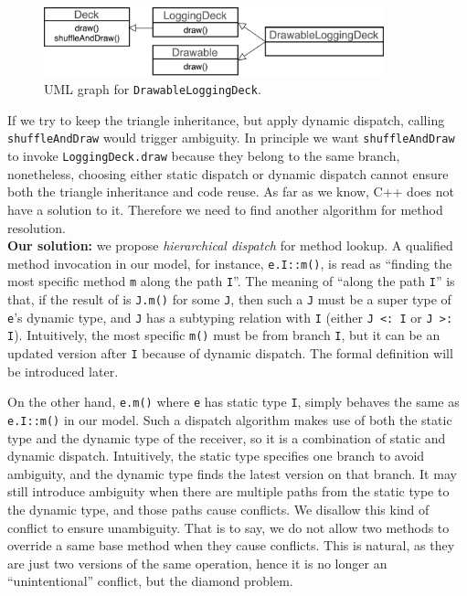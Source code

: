 \begin{figure}[t]
  \centering
  \includegraphics[height=2cm]{pics/DrawableLoggingDeck.pdf}
  \caption{UML graph for \lstinline|DrawableLoggingDeck|.}\label{fig:drawableloggingdeck}
\end{figure}
If we try to keep the triangle inheritance, but apply dynamic dispatch, calling \lstinline|shuffleAndDraw| would trigger ambiguity. 
In principle we want \lstinline|shuffleAndDraw| to invoke \lstinline|LoggingDeck.draw| because they belong to the same branch, 
nonetheless, choosing either static dispatch
or dynamic dispatch cannot ensure both the triangle inheritance and code reuse. As far as we know, C++ does not have a solution
to it. Therefore we need to find another algorithm for method resolution.\\

\noindent\textbf{Our solution:} we propose \textit{hierarchical dispatch} for method lookup. A qualified
method invocation in our model, for instance, \lstinline|e.I::m()|, is read as
``finding the most specific method \lstinline|m| along the path
\lstinline|I|''. The meaning of ``along the path \lstinline|I|'' is
that, if the result of \dispatch{} is \lstinline|J.m()| for some \lstinline|J|, then such a \lstinline|J| must be a super type of \lstinline|e|'s dynamic type, and \lstinline|J| has a subtyping relation with \lstinline|I| (either \lstinline|J <: I| or \lstinline|J >: I|). Intuitively, the most specific \lstinline|m()| must be from branch \lstinline|I|, but it can be an updated version after \lstinline|I| because of dynamic dispatch. The formal definition will be introduced later.

On the other hand, \lstinline|e.m()| where \lstinline|e| has static type \lstinline|I|, simply behaves the same as \lstinline|e.I::m()| in our model. Such a dispatch algorithm makes use of both the static type and the dynamic type of the receiver, so it is a combination of static and dynamic dispatch. Intuitively, the static type specifies one branch to avoid ambiguity, and the dynamic type finds the latest version on that branch. It may still introduce ambiguity when there are multiple paths from the static type to the dynamic type, and those paths cause conflicts. We disallow this kind of conflict to ensure unambiguity. That is to say, we do not allow two methods to override a same base method when they cause conflicts. This is natural, as they are just two versions of the same operation, hence it is no longer an ``unintentional'' conflict, but the diamond problem.


